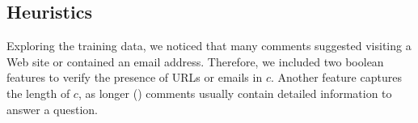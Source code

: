 %

\subsection{Heuristics}
\label{ssub:heuristics}

Exploring the training data, we noticed that many \good comments suggested visiting a Web 
site or contained an email address. Therefore, we included two boolean 
features 
to verify the presence of URLs or emails in $c$. Another feature captures the 
length of $c$, as longer (\good) comments usually contain detailed information 
to answer a question. 



% 
% 
% 


